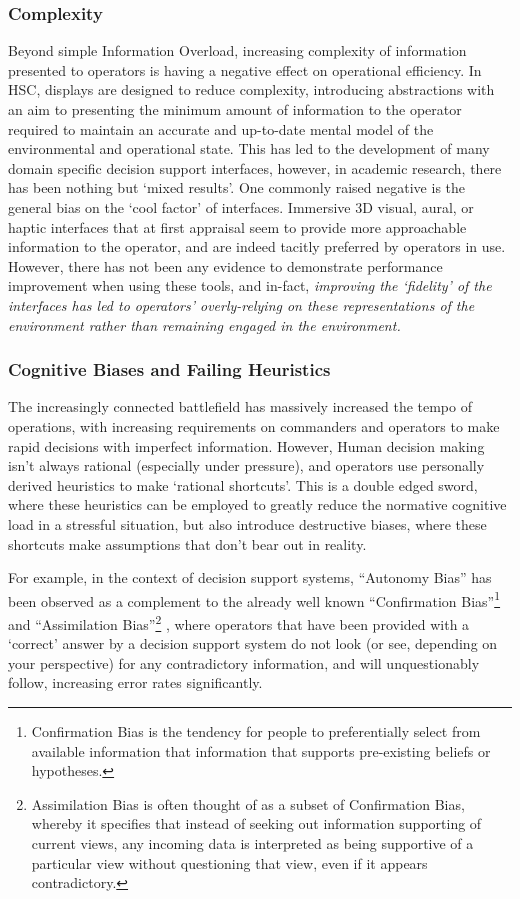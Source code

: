 \subsubsection{Complexity}
Beyond simple Information Overload, increasing complexity of information presented to operators is having a negative effect on operational efficiency. 
In HSC, displays are designed to reduce complexity, introducing abstractions with an aim to presenting the minimum amount of information to the operator required to maintain an accurate and up-to-date mental model of the environmental and operational state.
This has led to the development of many domain specific decision support interfaces, however, in academic research, there has been nothing but ‘mixed results’.
One commonly raised negative is the general bias on the ‘cool factor’ of interfaces.
Immersive 3D visual, aural, or haptic interfaces that at first appraisal seem to provide more approachable information to the operator, and are indeed tacitly preferred by operators in use. 
However, there has not been any evidence to demonstrate performance improvement when using these tools, and in-fact, \textit{improving the ‘fidelity’ of the interfaces has led to operators’ overly-relying on these representations of the environment rather than remaining engaged in the environment.}

\subsubsection{Cognitive Biases and Failing Heuristics}
The increasingly connected battlefield has massively increased the tempo of operations, with increasing requirements on commanders and operators to make rapid decisions with imperfect information.
However, Human decision making isn’t always rational (especially under pressure), and operators use personally derived heuristics to make ‘rational shortcuts’.
This is a double edged sword, where these heuristics can be employed to greatly reduce the normative cognitive load in a stressful situation, but also introduce destructive biases, where these shortcuts make assumptions that don’t bear out in reality.

For example, in the context of decision support systems, “Autonomy Bias” has been observed as a complement to the already well known “Confirmation Bias”\footnote{Confirmation Bias is the tendency for people to preferentially select from available information that information that supports pre-existing beliefs or hypotheses.}  and “Assimilation Bias”\footnote{Assimilation Bias is often thought of as a subset of Confirmation Bias, whereby it specifies that instead of seeking out information supporting of current views, any incoming data is interpreted as being supportive of a particular view without questioning that view, even if it appears contradictory.} , where operators that have been provided with a ‘correct’ answer by a decision support system do not look (or see, depending on your perspective) for any contradictory information, and will unquestionably follow, increasing error rates significantly. 


